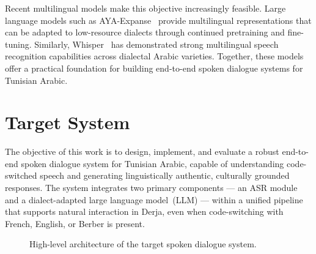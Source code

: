 \documentclass[12pt,a4paper]{report}
\begin{document}
Recent multilingual models make this objective increasingly feasible. Large language models
such as AYA-Expanse~\citep{dang2024ayaexpansecombiningresearch} provide multilingual
representations that can be adapted to low-resource dialects through continued pretraining
and fine-tuning. Similarly, Whisper~\citep{radford2022robustspeechrecognitionlargescale}
has demonstrated strong multilingual speech recognition capabilities across dialectal
Arabic varieties. Together, these models offer a practical foundation for building
end-to-end spoken dialogue systems for Tunisian Arabic.%
\section{Target System}
\label{sec:target}

The objective of this work is to design, implement, and evaluate a robust end-to-end spoken
dialogue system for Tunisian Arabic, capable of understanding code-switched speech and
generating linguistically authentic, culturally grounded responses. The system integrates
two primary components — an ASR module and a dialect-adapted large language model~(LLM) —
within a unified pipeline that supports natural interaction in Derja, even when
code-switching with French, English, or Berber is present.

\begin{figure}[H]
    \centering
    \caption{High-level architecture of the target spoken dialogue system.}
    \label{fig:target-system}
\end{figure}
\end{document}
